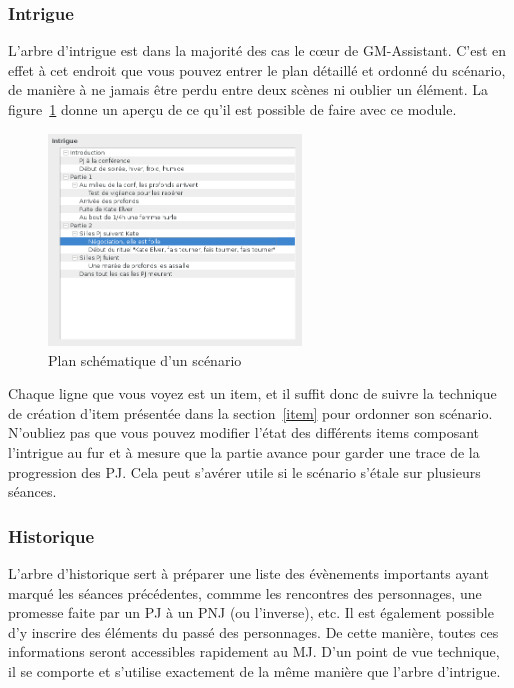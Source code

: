 \documentclass[a4paper,12pt]{article}
\newcommand*{\GMA}{GM-Assistant\xspace}
\begin{document}
\subsubsection{Intrigue}
\label{sec:intrigue}

L'arbre d'intrigue est dans la majorité des cas le cœur de \GMA.
C'est en effet à cet endroit que vous pouvez entrer le plan détaillé et ordonné du scénario, de manière à ne jamais être perdu entre deux scènes ni oublier un élément.
La figure~\ref{arbre_scenar} donne un aperçu de ce qu'il est possible de faire avec ce module.
\begin{figure}[h]
    \includegraphics[width=0.6\textwidth]{scenario_type}
    \caption{Plan schématique d'un scénario}
    \label{arbre_scenar}
\end{figure}
Chaque ligne que vous voyez est un item, et il suffit donc de suivre la technique de création d'item présentée dans la section~\ref{item} pour ordonner son scénario.
N'oubliez pas que vous pouvez modifier l'état des différents items composant l'intrigue au fur et à mesure que la partie avance pour garder une trace de la progression des PJ.
Cela peut s'avérer utile si le scénario s'étale sur plusieurs séances.

\subsubsection{Historique}
\label{sec:historique}

L'arbre d'historique sert à préparer une liste des évènements importants ayant marqué les séances précédentes, commme les rencontres des personnages, une promesse faite par un PJ à un PNJ (ou l'inverse), etc.
Il est également possible d'y inscrire des éléments du passé des personnages.
De cette manière, toutes ces informations seront accessibles rapidement au MJ.
D'un point de vue technique, il se comporte et s'utilise exactement de la même manière que l'arbre d'intrigue.
\end{document}
